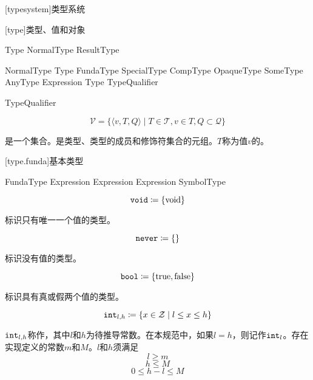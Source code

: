 
[typesystem]{类型系统}

[type]{类型、值和对象}

\begin{bnf}{Type}
    NormalType \br
    ResultType
\end{bnf}

\begin{bnf}{NormalType}
    \terminal{(} Type \terminal{)} \br
    FundaType \br
    SpecialType \br
    CompType \br
    OpaqueType \br
    SomeType \br
    AnyType \br
     \terminal{(} Expression \terminal{)} \br
    Type TypeQualifier
\end{bnf}

\begin{bnf}{TypeQualifier}
     \br
\end{bnf}

$$ \mathcal{V} = \{ \langle v, T, Q \rangle \mid T \in \mathcal{T}, v \in T, Q \subset \mathcal{Q} \} $$

\pnum
{}是一个集合。是类型、类型的成员和修饰符集合的元组。$T$称为值$v$的。

[type.funda]{基本类型}

\begin{bnf}{FundaType}
     \br
     \br
     \br
     \br
     \br
     \terminal{<} Expression \terminal{>} \br
     \terminal{<} Expression \terminal{>} \br
     \br
     \terminal{<} Expression \terminal{>} \br
     \br
     \br
    SymbolType
\end{bnf}

$$\texttt{void} \coloneqq \{ \mathrm{void} \}$$

\pnum
{}标识只有唯一一个值的类型。

$$\texttt{never} \coloneqq \{ \}$$

\pnum
{}标识没有值的类型。

$$\texttt{bool} \coloneqq \{ \mathrm{true}, \mathrm{false} \}$$

\pnum
{}标识具有真或假两个值的类型。

$$\texttt{int}_{l,h} \coloneqq \{ x \in \mathcal{Z} \mid l \le x \le h \} $$

\pnum
$\texttt{int}_{l,h}$称作，其中$l$和$h$为待推导常数。在本规范中，如果$l = h$，则记作$\texttt{int}_l$。存在实现定义的常数$m$和$M$。$l$和$h$须满足
$$ l \ge m $$
$$ h \le M $$
$$ 0 \le h - l \le M $$

